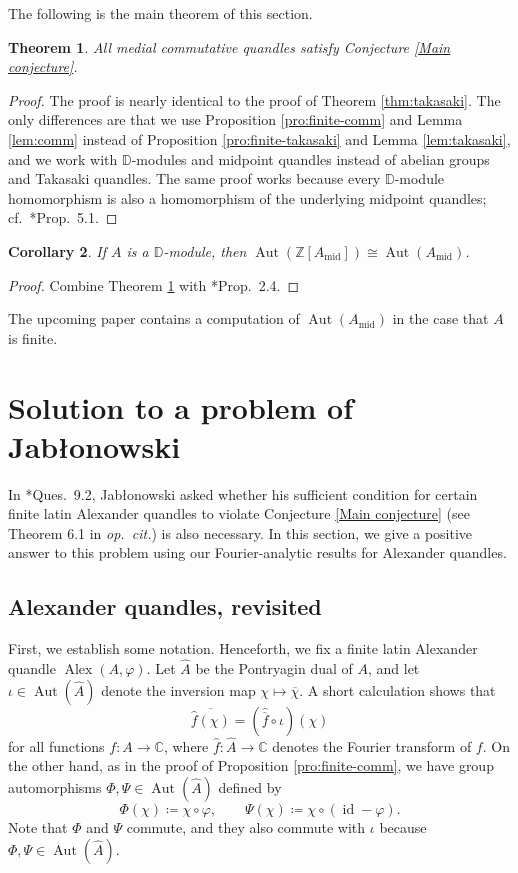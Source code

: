 \documentclass[12pt]{amsart}
\newtheorem{thm}{Theorem}[section]
\newtheorem{cor}[thm]{Corollary}
\theoremstyle{definition}
\theoremstyle{remark}
\newcommand{\Id}{\operatorname{id}}
\newcommand{\C}{\mathbb{C}}
\newcommand{\Z}{\mathbb{Z}}
\newcommand{\A}{\widehat{A}}
\renewcommand{\phi}{\varphi}
\newcommand{\Mid}{_{\operatorname{mid}}}
\def\Aut{\operatorname{Aut}}
\def\Alex{\operatorname{Alex}}
\begin{document}
The following is the main theorem of this section. 

\begin{thm}\label{thm:comm}
    All medial commutative quandles satisfy Conjecture \ref{Main conjecture}. 
\end{thm}

\begin{proof}
    The proof is nearly identical to the proof of Theorem \ref{thm:takasaki}. The only differences are that we use Proposition \ref{pro:finite-comm} and Lemma \ref{lem:comm} instead of Proposition \ref{pro:finite-takasaki} and Lemma \ref{lem:takasaki}, and we work with $\mathbb{D}$-modules and midpoint quandles instead of abelian groups and Takasaki quandles. The same proof works because every $\mathbb{D}$-module homomorphism is also a homomorphism of the underlying midpoint quandles; cf.\ \cite{ta-2026}*{Prop.\ 5.1}.
\end{proof} 

\begin{cor}
    If $A$ is a $\mathbb{D}$-module, then $\Aut(\Z[A\Mid])\cong\Aut(A\Mid)$.
\end{cor}

\begin{proof}
    Combine Theorem \ref{thm:comm} with \cite{bardakov-elhamdadi-2026}*{Prop.\ 2.4}.
\end{proof}

The upcoming paper \cite{sangare} contains a computation of $\Aut(A\Mid)$ in the case that $A$ is finite. 

\section{Solution to a problem of Jab\l onowski}\label{sec:jab}
In \cite{counterexample}*{Ques.\ 9.2}, Jab\l onowski asked whether his sufficient condition for certain finite latin Alexander quandles to violate Conjecture \ref{Main conjecture} (see Theorem 6.1 in \emph{op.\ cit.}) is also necessary. In this section, we give a positive answer to this problem using our Fourier-analytic results for Alexander quandles.

\subsection{Alexander quandles, revisited}
First, we establish some notation. 
Henceforth, we fix a finite latin Alexander quandle $\Alex(A,\phi)$. Let $\A$ be the Pontryagin dual of $A$, and let $\iota\in\Aut(\A)$ denote the inversion map $\chi\mapsto\overline\chi$. A short calculation shows that
\begin{equation}\label{eq:conjugate2}
    \overline{\hat{f}(\chi)}=(\hat{\overline f}\circ\iota)(\chi)
\end{equation}
for all functions $f\colon A\to\C$, where $\hat f\colon\A\to\C$ denotes the Fourier transform of $f$. 
On the other hand, as in the proof of Proposition \ref{pro:finite-comm}, we have group automorphisms $\Phi,\Psi\in\Aut(\A)$ defined by
\[
\Phi(\chi)\coloneq\chi\circ\phi,\qquad\Psi(\chi)\coloneq\chi\circ(\Id-\phi).
\]
Note that $\Phi$ and $\Psi$ commute, and they also commute with $\iota$ because $\Phi,\Psi\in\Aut(\A)$.
\end{document}
